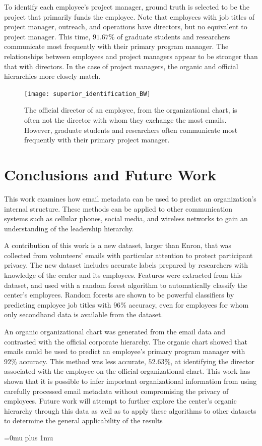 \documentclass[10pt,twocolumn,conference]{IEEEtran}
\begin{document}
To identify each employee's project manager, ground truth is selected to be the project that primarily funds the employee.
Note that employees with job titles of project manager, outreach, and operations have directors, but no equivalent to project manager.
This time, $91.67\%$ of graduate students and researchers communicate most frequently with their primary program manager.
The relationships between employees and project managers appear to be stronger than that with directors.
In the case of project managers, the organic and official hierarchies more closely match.

\begin{figure}[t]
	\centering
	\texttt{[image: superior\_identification\_BW]}
	\caption{The official director of an employee, from the organizational chart, is often not the director with whom they exchange the most emails.  However, graduate students and researchers often communicate most frequently with their primary project manager.}
	\label{fig:project_analysis}
\end{figure}

\section{Conclusions and Future Work} \label{Conclusions}
This work examines how email metadata can be used to predict an organization's internal structure.
These methods can be applied to other communication systems such as cellular phones, social media, and wireless networks to gain an understanding of the leadership hierarchy.

A contribution of this work is a new dataset, larger than Enron, that was collected from volunteers' emails with particular attention to protect participant privacy.
The new dataset includes accurate labels prepared by researchers with knowledge of the center and its employees.
Features were extracted from this dataset, and used with a random forest algorithm to automatically classify the center's employees.
Random forests are shown to be powerful classifiers by predicting employee job titles with $96\%$ accuracy, even for employees for whom only secondhand data is available from the dataset.

An organic organizational chart was generated from the email data and contrasted with the official corporate hierarchy.
The organic chart showed that emails could be used to predict an employee's primary program manager with $92\%$ accuracy.
This method was less accurate, $52.63\%$, at identifying the director associated with the employee on the official organizational chart.
This work has shown that it is possible to infer important organizational information from using carefully processed email metadata without compromising the privacy of employees.
Future work will attempt to further explore the center's organic hierarchy through this data as well as to apply these algorithms to other datasets to determine the general applicability of the results


\balance


\balance

\Urlmuskip=0mu plus 1mu\relax


\end{document}
